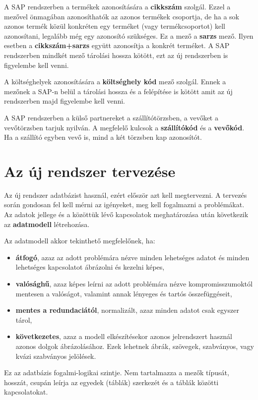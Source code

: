 \documentclass[a4paper,12pt]{report}
\begin{document}
A SAP rendszerben a termékek azonosítására a \textbf{cikkszám} szolgál. Ezzel a
mezővel önmagában azonosíthatók az azonos termékek csoportja, de ha a sok 
azonos termék közül konkréten egy terméket (vagy termékcsoportot) kell 
azonosítani, legalább még egy azonosító szükséges. Ez a mező a \textbf{sarzs} 
mező. Ilyen esetben a \textbf{cikkszám+sarzs} együtt azonosítja a konkrét 
terméket. A SAP rendszerben mindkét mező tárolási hossza kötött, ezt az új 
rendszerben is figyelembe kell venni.


A költséghelyek azonosítására a \textbf{költséghely kód} mező szolgál. Ennek a 
mezőnek a SAP-n belül a tárolási hossza és a felépítése is kötött amit az új 
rendszerben majd figyelembe kell venni.

A SAP rendszerben a külső partnereket a szállítótörzsben, a vevőket a 
vevőtörzsben tarjuk nyilván. A megfelelő kulcsok a \textbf{szállítókód} és a 
\textbf{vevőkód}. Ha a szállító egyben vevő is, mind a két törzsben kap 
azonosítót.

\chapter{Az új rendszer tervezése}

Az új rendszer adatbázist használ, ezért először azt kell megtervezni. 
A tervezés során gondosan fel kell mérni az igényeket, meg kell fogalmazni a 
problémákat. Az adatok jellege és a közöttük lévő kapcsolatok meghatározása 
után következik az \textbf{adatmodell} létrehozása. 

Az adatmodell akkor tekinthető megfelelőnek, ha:
\begin{itemize}
 \item \textbf{átfogó}, azaz az adott problémára nézve minden lehetséges adatot
 és minden lehetséges kapcsolatot ábrázolni és kezelni képes,
 \item \textbf{valósághű}, azaz képes leírni az adott problémára nézve
 kompromisszumoktól mentesen a valóságot, valamint annak lényeges és tartós 
 összefüggéseit,
 \item \textbf{mentes a redundaciától}, normalizált, azaz minden adatot csak 
egyszer tárol,
 \item \textbf{következetes}, azaz a modell elkészítésekor azonos jelrendszert 
használ azonos dolgok ábrázolásához. Ezek lehetnek ábrák, szövegek, szabványos, 
vagy kvázi szabványos jelölések.
\end{itemize}
Ez az adatbázis fogalmi-logikai szintje. Nem tartalmazza a mezők típusát, 
hosszát, csupán leírja az egyedek (táblák) szerkezét és a táblák közötti 
kapcsolatokat.
\end{document}
